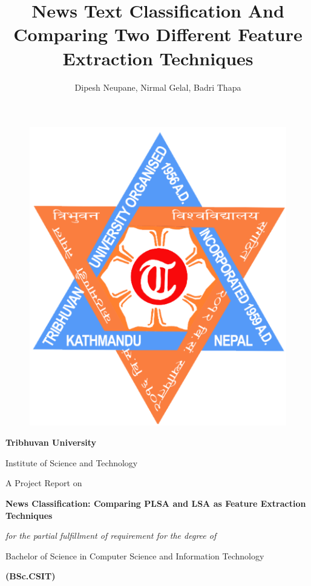 \documentclass[12pt]{report}
\title{News Text Classification And Comparing Two Different Feature Extraction Techniques}
\author{Dipesh Neupane, Nirmal Gelal, Badri Thapa}
\begin{document}
    \begin{center}
        
        \begin{figure}
            \centering
            \includegraphics[scale=0.3]{tulogo.png}
        \end{figure}
    \vskip 1in
    \begin{Huge}
    \textbf{Tribhuvan University}

    Institute of Science and Technology\\[0.5in]
    \end{Huge}
    

    
    
    \begin{Large}
    A Project Report on
    
    \textbf{News Classification: Comparing PLSA and LSA as Feature Extraction Techniques}\\[0.5in]
    \end{Large}
    \emph{for the partial fulfillment of requirement for the degree of}
    
    
    \begin{large}Bachelor of Science in Computer Science and Information Technology

    \textbf{(BSc.CSIT)}\\[0.5in]
    \end{large}
    

\end{center}
\end{document}
